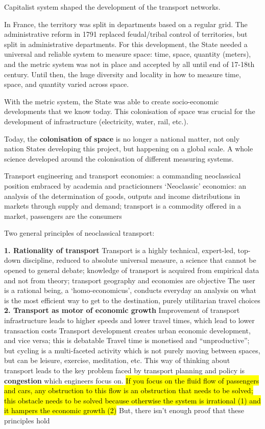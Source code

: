 \documentclass{article}
\begin{document}
Capitalist system shaped the development of the transport networks.

In France, the territory was split in departments based on a regular grid. The administrative reform in 1791 replaced feudal/tribal control of territories, but split in administrative departments. For this development, the State needed a universal and reliable system to measure space: time, space, quantity (meters), and the metric system was not in place and accepted by all until end of 17-18th century. Until then, the huge diversity and locality in how to measure time, space, and quantity varied across space.

With the metric system, the State was able to create socio-economic developments that we know today. This colonisation of space was crucial for the development of infrastructure (electricity, water, rail, etc.). 

Today, the \textbf{colonisation of space} is no longer a national matter, not only nation States developing this project, but happening on a global scale. A whole science developed around the colonisation of different measuring systems. 

\begin{outline}
	\1 Transport engineering and transport economies: a commanding neoclassical position embraced by academia and practicionners
	\1 `Neoclassic' economics: an analysis of the determination of goods, outputs and income distributions in markets through supply and demand; transport is a commodity offered in a market, passengers are the consumers
\end{outline}

Two general principles of neoclassical transport:

\begin{outline}
	\1 \textbf{1. Rationality of transport}
		\2 Transport is a highly technical, expert-led, top-down discipline, reduced to absolute universal measure, a science that cannot be opened to general debate; knowledge of transport is acquired from empirical data and not from theory; transport geography and economies are objective
		\2 The user is a rational being, a `homo-economicus', conducts everyday an analysis on what is the most efficient way to get to the destination, purely utilitarian travel choices
	\1 \textbf{2. Transport as motor of economic growth}
		\2 Improvement of transport infrastructure leads to higher speeds and lower travel times, which lead to lower transaction costs
		\2 Transport development creates urban economic development, and vice versa; this is debatable
		\2 Travel time is monetised and ``unproductive''; but cycling is a multi-faceted activity which is not purely moving between spaces, but can be leisure, exercise, meditation, etc. 
		\2 This way of thinking about transport leads to the key problem faced by transport planning and policy is \textbf{congestion} which engineers focus on. \hl{If you focus on the fluid flow of passengers and cars, any obstruction to this flow is an obstruction that needs to be solved; this obstacle needs to be solved because otherwise the system is irrational (1) and it hampers the economic growth (2)}
	\1 But, there isn't enough proof that these principles hold
\end{outline}
\end{document}
